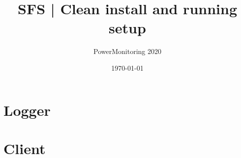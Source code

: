 \documentclass[a4paper, 12pt, one column, aas_macros]{article}
\begin{document}
\begin{titlepage}
    \title{
        SFS | Clean install and running setup
    }
    \author{PowerMonitoring 2020}
    \date{\today}
    \thispagestyle{empty}
\end{titlepage}

\maketitle
\thispagestyle{empty}

\newpage
\thispagestyle{empty}
\tableofcontents
\newpage
\setcounter{page}{1}
\section{Logger}



\section{Client}





\end{document}
